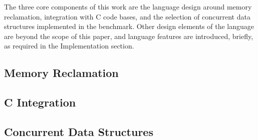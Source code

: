 The three core components of this work are the language design around memory reclamation, integration with C code bases, and the selection of concurrent data structures implemented in the benchmark.  Other design elements of the language are beyond the scope of this paper, and language features are introduced, briefly, as required in the Implementation section.

\subsection{Memory Reclamation}



\subsection{C Integration}



\subsection{Concurrent Data Structures}

